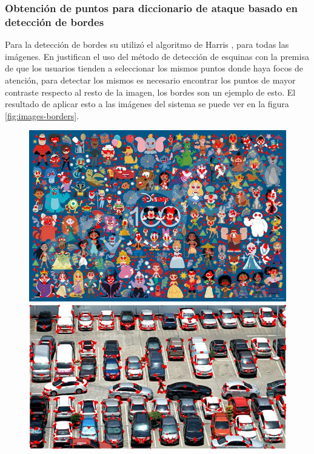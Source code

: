 \subsubsection{Obtenci\'on de puntos para diccionario de ataque basado en detecci\'on de bordes}
Para la detecci\'on de bordes su utiliz\'o el algoritmo de Harris \cite{Harris1988ACC}, para todas las im\'agenes. En \cite{van2010purely} justifican el uso del m\'etodo de detecci\'on de esquinas con la premisa de que los usuarios tienden a seleccionar los mismos puntos donde haya focos de atenci\'on, para detectar los mismos es necesario encontrar los puntos de mayor contraste respecto al resto de la imagen, los bordes son un ejemplo de esto. El resultado de aplicar esto a las im\'agenes del sistema se puede ver en la figura \ref{fig:images-borders}.

\begin{figure}[ht]
	\centering
	\begin{minipage}[hb]{0.3\textwidth}
		\centering
		\includegraphics[width=\textwidth]{Graphics/bordes_disney.jpg}
	\end{minipage}
	\hfill
	\begin{minipage}[hb]{0.3\textwidth}
		\centering
		\includegraphics[width=\textwidth]{Graphics/bordes_cars.jpg}

\end{minipage}
\end{figure}
